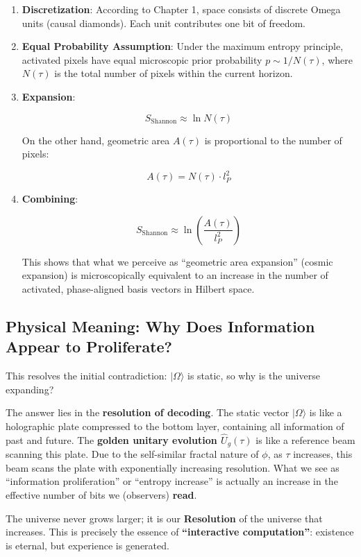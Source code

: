 \begin{enumerate}
\item \textbf{Discretization}: According to Chapter 1, space consists of discrete Omega units (causal diamonds). Each unit contributes one bit of freedom.
\item \textbf{Equal Probability Assumption}: Under the maximum entropy principle, activated pixels have equal microscopic prior probability $p \sim 1/N(\tau)$, where $N(\tau)$ is the total number of pixels within the current horizon.
\item \textbf{Expansion}:

\[S_{\text{Shannon}} \approx \ln N(\tau)\]

On the other hand, geometric area $A(\tau)$ is proportional to the number of pixels:

\[A(\tau) = N(\tau) \cdot l_P^2\]

\item \textbf{Combining}:

\[S_{\text{Shannon}} \approx \ln \left( \frac{A(\tau)}{l_P^2} \right)\]

This shows that what we perceive as ``geometric area expansion'' (cosmic expansion) is microscopically equivalent to an increase in the number of activated, phase-aligned basis vectors in Hilbert space.
\end{enumerate}

\subsection{Physical Meaning: Why Does Information Appear to Proliferate?}

This resolves the initial contradiction: $|\Omega\rangle$ is static, so why is the universe expanding?

The answer lies in the \textbf{resolution of decoding}.
The static vector $|\Omega\rangle$ is like a holographic plate compressed to the bottom layer, containing all information of past and future.
The \textbf{golden unitary evolution $\hat{U}_g(\tau)$} is like a reference beam scanning this plate.
Due to the self-similar fractal nature of $\phi$, as $\tau$ increases, this beam scans the plate with exponentially increasing resolution. What we see as ``information proliferation'' or ``entropy increase'' is actually an increase in the effective number of bits we (observers) \textbf{read}.

The universe never grows larger; it is our \textbf{Resolution} of the universe that increases. This is precisely the essence of \textbf{``interactive computation''}: existence is eternal, but experience is generated.
